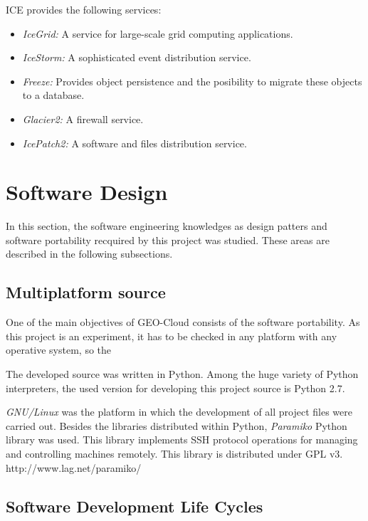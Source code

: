 \ac{ICE} provides the following services:
\begin{itemize}
\item \emph{IceGrid:} A service for large-scale grid computing applications. 
\item \emph{IceStorm:} A sophisticated event distribution service.
\item \emph{Freeze:} Provides object persistence and the posibility to migrate
  these objects to a database.
\item \emph{Glacier2:} A firewall service.
\item \emph{IcePatch2:} A software and files distribution service.
\end{itemize} 

\section{Software Design}

In this section, the software engineering knowledges as design patters and
software portability recquired by this project was studied. These areas are
described in the following subsections.

\subsection{Multiplatform source}

One of the main objectives of GEO-Cloud consists of the software portability. As
this project is an experiment, it has to be checked in any platform with any
operative system, so the   

The developed source was written in Python. Among the huge variety of Python
interpreters, the used version for developing this project source is Python 2.7.

\emph{GNU/Linux} was the platform in which the development of all project files were
carried out. Besides the libraries distributed within Python, \emph{Paramiko}
Python library was used. This library implements \ac{SSH} protocol operations
for managing and controlling machines remotely. This library is distributed
under \ac{GPL} v3.
http://www.lag.net/paramiko/  

\subsection{Software Development Life Cycles}

